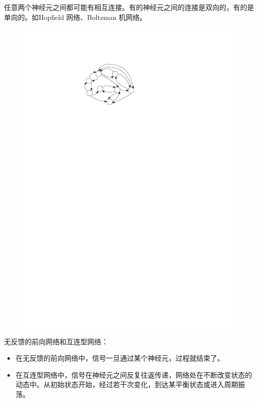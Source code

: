 \begin{definition}[互连型神经网络]
    任意两个神经元之间都可能有相互连接。有的神经元之间的连接是双向的，有的是单向的。如Hopfield 网络、Boltzman 机网络。
    \begin{figure}[htbp]
        \centering
        \includegraphics{image/互连型神经网络.pdf}
    \end{figure}
\end{definition}
\begin{note}
    无反馈的前向网络和互连型网络：
    \begin{itemize}
        \item 在无反馈的前向网络中，信号一旦通过某个神经元，过程就结束了。
        \item 在互连型网络中，信号在神经元之间反复往返传递，网络处在不断改变状态的动态中。从初始状态开始，经过若干次变化，到达某平衡状态或进入周期振荡。
    \end{itemize}
\end{note}
